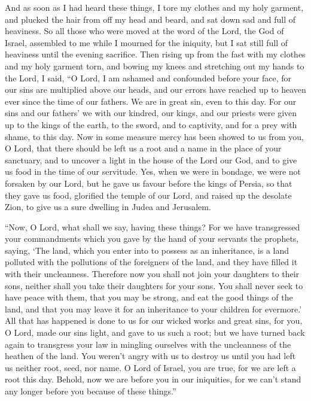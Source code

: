  And as soon as I had heard these things, I tore my clothes
and my holy garment, and plucked the hair from off my head and beard,
and sat down sad and full of heaviness.  So all those who
were moved at the word of the Lord, the God of Israel, assembled to me
while I mourned for the iniquity, but I sat still full of heaviness
until the evening sacrifice.  Then rising up from the fast
with my clothes and my holy garment torn, and bowing my knees and
stretching out my hands to the Lord,  I said, ``O Lord, I
am ashamed and confounded before your face,  for our sins
are multiplied above our heads, and our errors have reached up to heaven
 ever since the time of our fathers. We are in great sin,
even to this day.  For our sins and our fathers' we with
our kindred, our kings, and our priests were given up to the kings of
the earth, to the sword, and to captivity, and for a prey with shame, to
this day.  Now in some measure mercy has been showed to us
from you, O Lord, that there should be left us a root and a name in the
place of your sanctuary,  and to uncover a light in the
house of the Lord our God, and to give us food in the time of our
servitude.  Yes, when we were in bondage, we were not
forsaken by our Lord, but he gave us favour before the kings of Persia,
so that they gave us food,  glorified the temple of our
Lord, and raised up the desolate Zion, to give us a sure dwelling in
Judea and Jerusalem.

 ``Now, O Lord, what shall we say, having these things? For
we have transgressed your commandments which you gave by the hand of
your servants the prophets, saying,  `The land, which you
enter into to possess as an inheritance, is a land polluted with the
pollutions of the foreigners of the land, and they have filled it with
their uncleanness.  Therefore now you shall not join your
daughters to their sons, neither shall you take their daughters for your
sons.  You shall never seek to have peace with them, that
you may be strong, and eat the good things of the land, and that you may
leave it for an inheritance to your children for evermore.'
 All that has happened is done to us for our wicked works
and great sins, for you, O Lord, made our sins light,  and
gave to us such a root; but we have turned back again to transgress your
law in mingling ourselves with the uncleanness of the heathen of the
land.  You weren't angry with us to destroy us until you
had left us neither root, seed, nor name.  O Lord of
Israel, you are true, for we are left a root this day. 
Behold, now we are before you in our iniquities, for we can't stand any
longer before you because of these things.''

